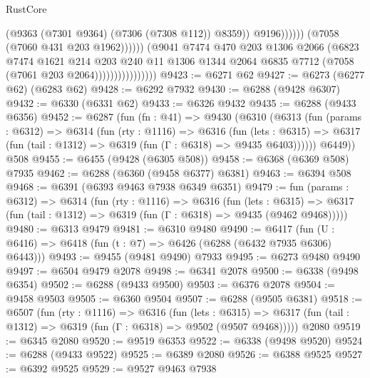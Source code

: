 \begin{lexlean}{RustCore}
\begin{coremodule}
                                                  (@9363 (@7301 @9364) (@7306 (@7308 @112)) @8359))
                                                @9196))))))
                                    (@7058 (@7060 @431 @203 @1962))))))
                            (@9041
                              @7474
                              @470
                              @203
                              @1306
                              @2066
                              (@6823
                                @7474
                                @1621
                                @214
                                @203
                                @240
                                @11
                                @1306
                                @1344
                                @2064
                                @6835
                                @7712
                                (@7058 (@7061 @203 @2064))))))))))))))))
@9423 := @6271 @62
@9427 := @6273 (@6277 @62) (@6283 @62)
@9428 := @6292 @7932
@9430 := @6288 (@9428 @6307)
@9432 := @6330 (@6331 @62)
@9433 := @6326 @9432
@9435 := @6288 (@9433 @6356)
@9452 := @6287
    (fun (fn : @41) =>
    @9430
      (@6310
        (@6313
          (fun (params : @6312) =>
          @6314
            (fun (rty : @1116) =>
            @6316
              (fun (lets : @6315) =>
              @6317 (fun (tail : @1312) => @6319 (fun (Γ : @6318) => @9435 @6403))))))
        @6449))
    @508
@9455 := @6455 (@9428 (@6305 @508))
@9458 := @6368 (@6369 @508) @7935
@9462 := @6288 (@6360 (@9458 @6377) @6381)
@9463 := @6394 @508
@9468 := @6391 (@6393 @9463 @7938 @6349 @6351)
@9479 := fun (params : @6312) =>
  @6314
    (fun (rty : @1116) =>
    @6316
      (fun (lets : @6315) =>
      @6317 (fun (tail : @1312) => @6319 (fun (Γ : @6318) => @9435 (@9462 @9468)))))
@9480 := @6313 @9479
@9481 := @6310 @9480
@9490 := @6417 (fun (U : @6416) => @6418 (fun (t : @7) => @6426 (@6288 (@6432 @7935 @6306) @6443)))
@9493 := @9455 (@9481 @9490) @7933
@9495 := @6273 @9480 @9490
@9497 := @6504 @9479 @2078
@9498 := @6341 @2078
@9500 := @6338 (@9498 @6354)
@9502 := @6288 (@9433 @9500)
@9503 := @6376 @2078
@9504 := @9458 @9503
@9505 := @6360 @9504
@9507 := @6288 (@9505 @6381)
@9518 := @6507
    (fun (rty : @1116) =>
    @6316
      (fun (lets : @6315) =>
      @6317 (fun (tail : @1312) => @6319 (fun (Γ : @6318) => @9502 (@9507 @9468)))))
    @2080
@9519 := @6345 @2080
@9520 := @9519 @6353
@9522 := @6338 (@9498 @9520)
@9524 := @6288 (@9433 @9522)
@9525 := @6389 @2080
@9526 := @6388 @9525
@9527 := @6392 @9525
@9529 := @9527 @9463 @7938

\end{coremodule}
\end{lexlean}
